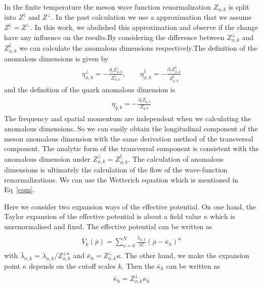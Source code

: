\documentclass[%
reprint,
superscriptaddress,
showpacs,preprintnumbers,
 amsmath,amssymb,
 aps,
prd,
]{revtex4-1}
\begin{document}
In the finite temperature the meson wave function renormalization $Z_{\phi,k}$ is split into $Z^\|$ and $Z^\bot$. In the past 
calculation we use a approximation that we assume $Z^\|=Z^\bot$. In this work, we abolished this approximation and observe if the change 
have any influence on the results.By considering the difference between $Z^\bot_{\phi,k}$ and $Z^\|_{\phi,k}$ we can calculate the anomalous dimensions 
respectively.The definition of the anomalous dimensions is given by
\begin{align}
\eta_{\phi,k}^\bot=-\frac{\partial_tZ_{\phi,k}^\bot}{Z_{\phi,k}^\bot} ,\qquad \eta_{\phi,k}^\|=-\frac{\partial_tZ_{\phi,k}^\|}
{Z_{\phi,k}^\|}\label{eq:anodim}
\end{align}
and the definition of the quark anomalous dimension is
\begin{align}
\begin{split}
\eta_{q,k}=-\frac{\partial_tZ_{q,k}}{Z_{q,k}}
\end{split}
\end{align}
The frequency and spatial momentum are independent when we calculating the anomalous dimensions. So we can easily obtain the longitudinal component
of the meson anomalous dimension with the same derivation method of the transversal component. The analytic form of the transversal component is consistent
with the anomalous dimension under $Z^{\bot}_{\phi,k}=Z^{\|}_{\phi,k}$. The calculation of anomalous dimensions is ultimately the calculation of the flow of the 
wave-function renormalizations. We can use the Wetterich equation which is mentioned in Eq~\ref{cqm}.



Here we consider two expansion ways of the effective potential. On one hand, the Taylor expansion of the effective 
potential is about a field value $\kappa$ which is unrenormalised and fixed. The effective potential can be written as
\begin{align}\label{}
\begin{split}
\bar{V}_k(\bar{\rho})=\sum^{N}_{n=0}\frac{\bar{\lambda}_{n,k}}{n!}(\bar{\rho}-\bar{\kappa}_k)^n
\end{split}
\end{align}
with $\bar{\lambda}_{n,k}=\lambda_{n,k}/Z^{\bot n}_{\phi,k}$ and $\bar{\kappa}_k=Z^{\bot}_{\phi,k}\kappa$.
The other hand, we make the expansion point $\kappa$ depends on the cutoff scales $k$. Then the $\bar{\kappa}_k$ 
can be written as
\begin{align}\label{}
\begin{split}
\bar{\kappa}_k=Z^{\bot}_{\phi,k}\kappa_k
\end{split}
\end{align} 
\end{document}
